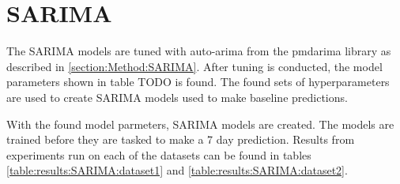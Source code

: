 \section{SARIMA}
\label{section:Results:SARIMA}

The SARIMA models are tuned with auto-arima from the pmdarima library as described in \cref{section:Method:SARIMA}.
After tuning is conducted, the model parameters shown in table TODO is found.
The found sets of hyperparameters are used to create SARIMA models used to make baseline predictions.


With the found model parmeters, SARIMA models are created.
The models are trained before they are tasked to make a 7 day prediction.
Results from experiments run on each of the datasets can be found in tables
\cref{table:results:SARIMA:dataset1} and \cref{table:results:SARIMA:dataset2}.

